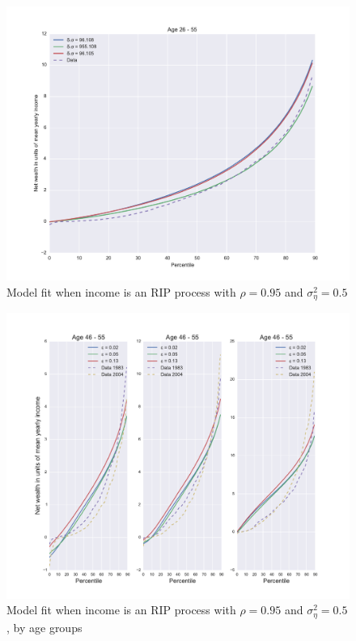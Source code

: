 \begin{figure}
\includegraphics[width=\columnwidth]{winfriedcompare}
\caption{Model fit when income is an RIP process with $\rho=0.95$ and $\sigma^2_{\eta}=0.5$}
\label{fig:winfriedcompare}
\end{figure}

\begin{figure}
\includegraphics[width=\columnwidth]{comp_stat_eps_agedetail}
\caption{Model fit when income is an RIP process with $\rho=0.95$ and $\sigma^2_{\eta}=0.5$, by age groups}
\label{fig:winfriedcompare_agedetail}
\end{figure}

